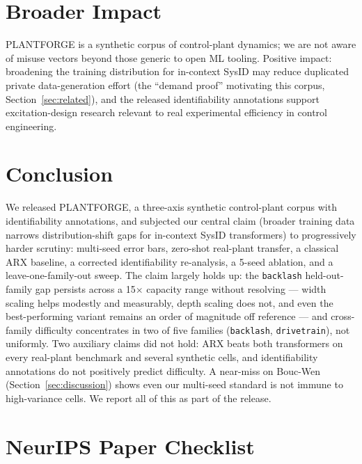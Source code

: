 \documentclass{article}
\begin{document}
\section{Broader Impact}
\label{sec:broaderimpact}

PLANTFORGE is a synthetic corpus of control-plant dynamics; we are not aware
of misuse vectors beyond those generic to open ML tooling. Positive impact:
broadening the training distribution for in-context SysID may reduce
duplicated private data-generation effort (the ``demand proof'' motivating
this corpus, Section~\ref{sec:related}), and the released identifiability
annotations support excitation-design research relevant to real
experimental efficiency in control engineering.

\section{Conclusion}

We released PLANTFORGE, a three-axis synthetic control-plant corpus with
identifiability annotations, and subjected our central claim (broader
training data narrows distribution-shift gaps for in-context SysID
transformers) to progressively harder scrutiny: multi-seed error bars,
zero-shot real-plant transfer, a classical ARX baseline, a corrected
identifiability re-analysis, a 5-seed ablation, and a
leave-one-family-out sweep. The claim largely holds up: the \texttt{backlash}
held-out-family gap persists across a 15$\times$ capacity range without
resolving --- width scaling helps modestly and measurably, depth scaling does
not, and even the best-performing variant remains an order of magnitude off
reference --- and cross-family difficulty concentrates in two of five families
(\texttt{backlash}, \texttt{drivetrain}), not uniformly. Two auxiliary
claims did not hold: ARX beats both transformers on every real-plant
benchmark and several synthetic cells, and identifiability annotations do
not positively predict difficulty. A near-miss on Bouc-Wen
(Section~\ref{sec:discussion}) shows even our multi-seed standard is not
immune to high-variance cells. We report all of this as part of the release.




\newpage
\section{NeurIPS Paper Checklist}
\end{document}
